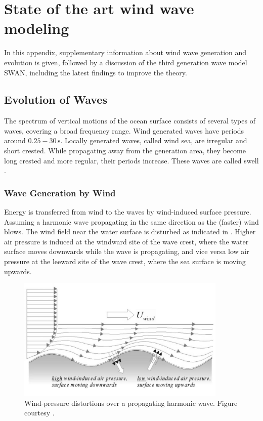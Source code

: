 \chapter{State of the art wind wave modeling}

In this appendix, supplementary information about wind wave generation and 
evolution is given, followed by a discussion of the third generation wave model 
SWAN, including the latest findings to improve the theory.

\section{Evolution of Waves}

The spectrum of vertical motions of the ocean surface consists of several types 
of waves, covering a broad frequency range.  Wind generated 
waves have periods around $0.25 - 30\,\text{s}$. Locally generated waves, 
called 
wind sea, are irregular and short crested. While propagating away from the 
generation area, they become long crested and more regular, their periods 
increase. These waves are called swell \citep[][]{holthuijsen2007}. 

\subsection{Wave Generation by Wind}
Energy is transferred from wind to the waves by wind-induced surface pressure. 
Assuming a harmonic wave propagating in the same direction as the (faster) wind 
blows. The wind field near the water surface is disturbed as indicated in 
. Higher air pressure is induced at the windward site of the wave 
crest, where the water surface moves downwards while the wave is propagating, 
and vice versa low air pressure at the leeward site of the wave crest, where 
the sea surface is moving upwards.
\begin{figure}[ht]

 \includegraphics[width=10cm]{bilder/windpressure_sw.png}
 \caption{Wind-pressure distortions over a propagating harmonic wave. Figure 
courtesy \cite{holthuijsen2007}. \label{windgen}}
\end{figure}

